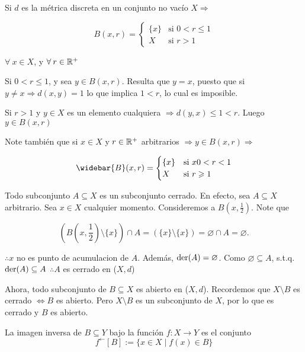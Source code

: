 \begin{remark}
    Si $d$ es la métrica discreta en un conjunto no vacío $X \Rightarrow$

    $$ B(x,r) = \begin{cases}
              \{ x \} & \text{si }  0 < r \leqslant 1\\
              X & \text{si } r >1
     \end{cases}$$

     $\forall \: x \in X$, y $\forall \: r \in \mathbb{R}^+$

     Si $0 < r \leqslant 1$, y sea $y \in B(x,r)$. Resulta que $y=x$, puesto que si $y \neq x \Rightarrow d(x,y) = 1$ lo que implica $1 < r$, lo cual es imposible.

     Si $r > 1$ y $ y \in X$ es un elemento cualquiera $\Rightarrow d(y,x) \leqslant 1 < r$. Luego $y \in B(x,r)$

     Note también que si $x \in X$ y $r \in \mathbb{R}^+$ arbitrarios $\Rightarrow y \in B(x,r) \Rightarrow$

     $$ \widebar{B}(x,r) = \begin{cases}
         \{ x \} & \text{si } x 0 < r <  1\\
              X & \text{si } r \geqslant 1
     \end{cases}$$

     Todo subconjunto $A \subseteq X$ es un subconjunto cerrado. En efecto, sea $A \subseteq X$ arbitrario. Sea $x \in X$ cualquier momento. Consideremos a $B\left(x,\frac{1}{2}\right)$. Note que

     \begin{equation*}
         \left(B\left(x,\frac{1}{2}\right) \setminus \{ x \} \right) \cap A = (\{ x \} \setminus \{ x \}) = \varnothing \cap A = \varnothing.
     \end{equation*}

    $\therefore x$ no es punto de acumulacion de $A.$ Además, $\mathrm{der}(A) = \varnothing$. Como $\varnothing \subseteq A$, s.t.q. $\mathrm{der}(A) \subseteq A$ $\therefore A$ es cerrado en ($X,d$) 

    Ahora, todo subconjunto de $B \subseteq X$ es abierto en ($X,d$). Recordemos que $X \setminus B$ es cerrado $\Leftrightarrow B$ es abierto. Pero $X \setminus B$ es un subconjunto de $X$, por lo que es cerrado y $B$ es abierto.
\end{remark}

\begin{definition}
    La imagen inversa de $B \subseteq Y$ bajo la función $f: X \to Y$ es el conjunto
    $$f^\leftarrow[B] := \{ x \in X \mid f(x) \in B \}$$
\end{definition}

